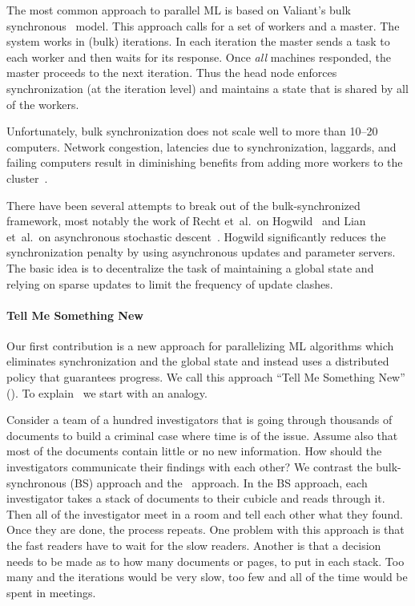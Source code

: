 The most common approach to parallel ML is based on Valiant's bulk
synchronous~\cite{valiant_bridging_1990} model. This approach calls for a
set of workers and a master. The system works in (bulk) iterations. In each iteration
the master sends a task to each worker and then waits for its
response. Once {\em all} machines responded, the master proceeds to the
next iteration. Thus the head node enforces synchronization (at the
iteration level) and maintains
a state that is shared by all of the workers.

Unfortunately, bulk synchronization does not scale well to more than
10--20 computers. Network congestion, latencies due to synchronization,
laggards, and failing computers result in diminishing benefits from
adding more workers to the
cluster~\cite{zaharia_apache_2016,mcsherry_scalability!_2015}.

There have been several attempts to break out of the bulk-synchronized
framework, most notably the work of Recht et~al.\ on
Hogwild~\cite{recht_hogwild:_2011} and Lian et~al.\ on asynchronous
stochastic descent~\cite{lian_asynchronous_2015}. Hogwild
significantly reduces the synchronization penalty by using
asynchronous updates and parameter servers. The basic idea is to
decentralize the task of maintaining a global state and relying on
sparse updates to limit the frequency of update clashes.

\paragraph{Tell Me Something New}

Our first contribution is a new approach for parallelizing ML algorithms
which eliminates synchronization and the global state and instead uses a
distributed policy that guarantees progress. We call this approach
``Tell Me Something New'' (\tmsn). To explain \tmsn\ we start with an
analogy.

Consider a team of a hundred investigators that is going through
thousands of documents to build a criminal case where time is of the
issue. Assume also that most of the documents contain little or no new
information. How should the investigators communicate their findings
with each other? We contrast the bulk-synchronous (BS) approach and the
\tmsn\ approach. In the BS approach, each investigator takes a stack
of documents to their cubicle and reads through it. Then all of the
investigator meet in a room and tell each other what they found. Once
they are done, the process repeats. One problem with this approach is
that the fast readers have to wait for the slow readers. Another is
that a decision needs to be made as to how many documents or pages, to
put in each stack. Too many and the iterations would be very slow, too
few and all of the time would be spent in meetings.

